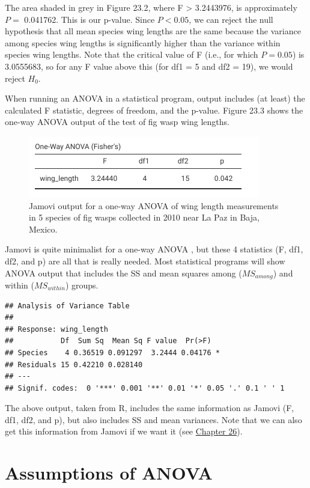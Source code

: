 \documentclass[
]{scrbook}
\begin{document}
The area shaded in grey in Figure 23.2, where F \textgreater{} 3.2443976, is approximately \(P =\) 0.041762.
This is our p-value.
Since \(P < 0.05\), we can reject the null hypothesis that all mean species wing lengths are the same because the variance among species wing lengths is significantly higher than the variance within species wing lengths.
Note that the critical value of F (i.e., for which \(P = 0.05\)) is 3.0555683, so for any F value above this (for df1 = 5 and df2 = 19), we would reject \(H_{0}\).

When running an ANOVA in a statistical program, output includes (at least) the calculated F statistic, degrees of freedom, and the p-value.
Figure 23.3 shows the one-way ANOVA output of the test of fig wasp wing lengths.

\begin{figure}
\includegraphics[width=0.6\linewidth]{img/jamovi_ANOVA_output} \caption{Jamovi output for a one-way ANOVA of wing length measurements in 5 species of fig wasps collected in 2010 near La Paz in Baja, Mexico.}\label{fig:unnamed-chunk-113}
\end{figure}

Jamovi is quite minimalist for a one-way ANOVA \citep{Jamovi2022}, but these 4 statistics (F, df1, df2, and p) are all that is really needed.
Most statistical programs will show ANOVA output that includes the SS and mean squares among (\(MS_{among}\)) and within (\(MS_{within}\)) groups.

\begin{verbatim}
## Analysis of Variance Table
## 
## Response: wing_length
##           Df  Sum Sq  Mean Sq F value  Pr(>F)  
## Species    4 0.36519 0.091297  3.2444 0.04176 *
## Residuals 15 0.42210 0.028140                  
## ---
## Signif. codes:  0 '***' 0.001 '**' 0.01 '*' 0.05 '.' 0.1 ' ' 1
\end{verbatim}

The above output, taken from R, includes the same information as Jamovi (F, df1, df2, and p), but also includes SS and mean variances.
Note that we can also get this information from Jamovi if we want it (see \protect\hyperlink{Chapter_26}{Chapter 26}).

\hypertarget{assumptions-of-anova}{%
\section{Assumptions of ANOVA}\label{assumptions-of-anova}}
\end{document}
